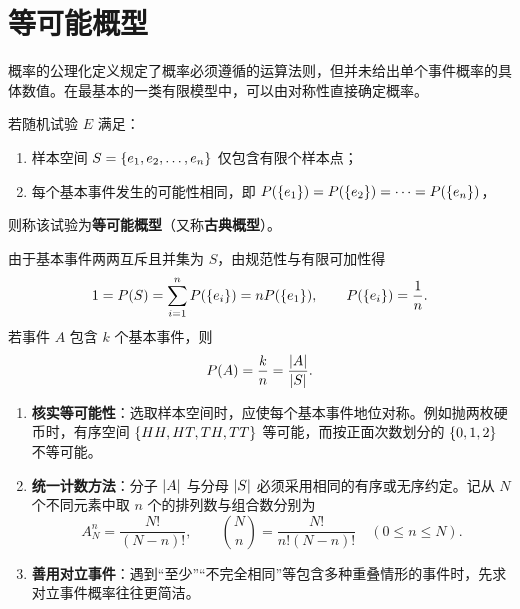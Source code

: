 \section{等可能概型}
\label{sec:classical-model}

概率的公理化定义规定了概率必须遵循的运算法则，但并未给出单个事件概率的具体数值。在最基本的一类有限模型中，可以由对称性直接确定概率。

\begin{definition}
\label{def:classical-model}
若随机试验 $E$ 满足：
\begin{enumerate}
  \item 样本空间 $S=\{e_1,e_2,\ldots,e_n\}$ 仅包含有限个样本点；
  \item 每个基本事件发生的可能性相同，即 $P(\{e_1\})=P(\{e_2\})=\cdots=P(\{e_n\})$，
\end{enumerate}
则称该试验为\textbf{等可能概型}（又称\textbf{古典概型}）。
\end{definition}

由于基本事件两两互斥且并集为 $S$，由规范性与有限可加性得
\[
  1=P(S)=\sum_{i=1}^{n}P(\{e_i\})=nP(\{e_1\}),\qquad P(\{e_i\})=\frac{1}{n}.
\]
若事件 $A$ 包含 $k$ 个基本事件，则
\begin{equation}
  P(A)=\frac{k}{n}=\frac{\lvert A\rvert}{\lvert S\rvert}.
  \label{eq:classical-probability}
\end{equation}

\begin{method}[古典概型计数要点]
\begin{enumerate}
  \item \textbf{核实等可能性}：选取样本空间时，应使每个基本事件地位对称。例如抛两枚硬币时，有序空间 $\{HH,HT,TH,TT\}$ 等可能，而按正面次数划分的 $\{0,1,2\}$ 不等可能。
  \item \textbf{统一计数方法}：分子 $\lvert A\rvert$ 与分母 $\lvert S\rvert$ 必须采用相同的有序或无序约定。记从 $N$ 个不同元素中取 $n$ 个的排列数与组合数分别为
  \[
    A_N^n=\frac{N!}{(N-n)!},\qquad \binom{N}{n}=\frac{N!}{n!(N-n)!}\quad(0\le n\le N).
  \]
  \item \textbf{善用对立事件}：遇到“至少”“不完全相同”等包含多种重叠情形的事件时，先求对立事件概率往往更简洁。
\end{enumerate}
\end{method}


